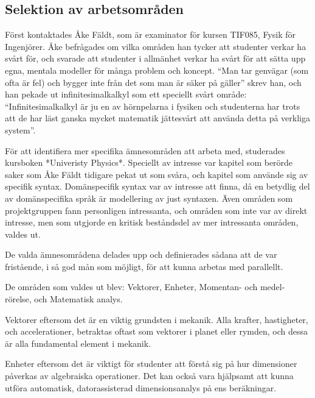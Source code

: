 \begin{binge}
\section{Selektion av arbetsområden}


\begin{draft}
  Först kontaktades Åke Fäldt, som är examinator för kursen TIF085,
  Fysik för Ingenjörer. Åke befrågades om vilka områden han tycker att
  studenter verkar ha svårt för, och svarade att studenter i allmänhet
  verkar ha svårt för att sätta upp egna, mentala modeller för många
  problem och koncept. ``Man tar genvägar (som ofta är fel) och bygger
  inte från det som man är säker på gäller'' skrev han, och han pekade
  ut infinitesimalkalkyl som ett speciellt svårt område:
  ``Infinitesimalkalkyl är ju en av hörnpelarna i fysiken och
  studenterna har trots att de har läst ganska mycket matematik
  jättesvårt att använda detta på verkliga system''.

  För att identifiera mer specifika ämnesområden att arbeta med,
  studerades kursboken *Univeristy Physics*. Speciellt av intresse var
  kapitel som berörde saker som Åke Fäldt tidigare pekat ut som svåra,
  och kapitel som använde sig av specifik syntax. Domänspecifik syntax
  var av intresse att finna, då en betydlig del av domänspecifika språk
  är modellering av just syntaxen. Även områden som projektgruppen fann
  personligen intressanta, och områden som inte var av direkt intresse,
  men som utgjorde en kritisk beståndsdel av mer intressanta områden,
  valdes ut.

  De valda ämnesområdena delades upp och definierades sådana att de var
  fristående, i så god mån som möjligt, för att kunna arbetas med
  parallellt.

  De områden som valdes ut blev: Vektorer, Enheter, Momentan- och
  medel-rörelse, och Matematisk analys.

  Vektorer eftersom det är en viktig grundsten i mekanik. Alla krafter,
  hastigheter, och accelerationer, betraktas oftast som vektorer i
  planet eller rymden, och dessa är alla fundamental element i
  mekanik.

  Enheter eftersom det är viktigt för studenter att förstå sig på hur
  dimensioner påverkas av algebraiska operationer. Det kan också vara
  hjälpsamt att kunna utföra automatisk, datorassisterad
  dimensionsanalys på ens beräkningar.


\end{draft}
\end{binge}
